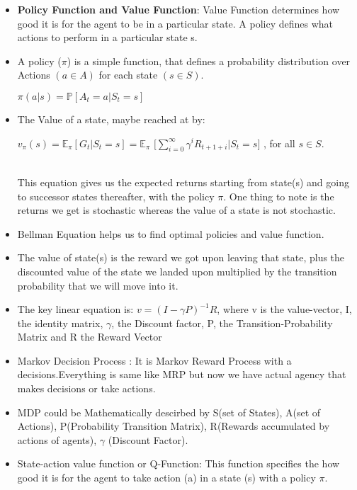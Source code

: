 \documentclass{article}
\begin{document}
\begin{itemize}
  \item \textbf{Policy Function and Value Function}: Value Function determines how good it is for the agent to be in a particular state. A policy defines what actions to perform in a particular state s.

  \item A policy ($\pi$) is a simple function, that defines a probability distribution over Actions $(a \in A)$ for each state $(s \in S)$.   \\
  \begin{center}
    $\pi (a|s) = \mathbb{P} [A_{t} = a | S_{t} = s]$
  \end{center}

  \item The Value of a state, maybe reached at by: \\
  \begin{center}
    $v_{\pi}(s) = \mathbb{E}_{\pi}[G_{t} | S_t = s] = \mathbb{E}_{\pi} $   $\Big[  \sum_{i = 0}^{ \infty }{ \gamma^{i} R_{t+1+i} } | S_{t} = s \Big]$  , for all $s \in S$. \\~\\
  \end{center}

  This equation gives us the expected returns starting from state(s) and going to successor states thereafter, with the policy $\pi$. One thing to note is the returns we get is stochastic whereas the value of a state is not stochastic.

  \item Bellman Equation helps us to find optimal policies and value function.
  \item The value of state(s) is the reward we got upon leaving that state, plus the discounted value of the state we landed upon multiplied by the transition probability that we will move into it.
  \item The key linear equation is: $v = (I - \gamma P)^{-1}R$, where v is the value-vector, I, the identity matrix, $\gamma$, the Discount factor, P, the Transition-Probability Matrix and R the Reward Vector
  \item Markov Decision Process : It is Markov Reward Process with a decisions.Everything is same like MRP but now we have actual agency that makes decisions or take actions.
  \item MDP could be Mathematically descirbed by S(set of States), A(set of Actions), P(Probability Transition Matrix), R(Rewards accumulated by actions of agents), $\gamma$ (Discount Factor).
  \item State-action value function or Q-Function: This function specifies the how good it is for the agent to take action (a) in a state (s) with a policy $\pi$.
\end{itemize}
\end{document}
